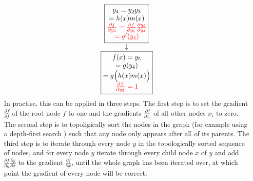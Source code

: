 \begin{equation*}
\begin{matrix}
\begin{matrix}
        \boxed{\begin{matrix}
            y_4 = y_2 y_3 \\
            = h(x) m(x) \\
            \color{red}{\frac{\partial f}{\partial y_4} = \frac{\partial f}{\partial y_5}\frac{\partial y_5}{\partial y_4}} \\
            \color{red}{= g'(y_4)}
        \end{matrix}} \\
        \downarrow \\
        \boxed{\begin{matrix}
            f(x) = y_5 \\
            = g(y_4) \\
            = g\Bigl(h(x) m(x)\Bigr) \\
            \color{red}{\frac{\partial f}{\partial y_5} = 1}
        \end{matrix}}
    \end{matrix}
    \end{matrix}
\end{equation*}
In practise, this can be applied in three steps. The first step is to set the gradient $\frac{\partial f}{\partial f}$ of the root node $f$ to one and the gradients $\frac{\partial f}{\partial x_i}$ of all other nodes $x_i$ to zero. The second step is to topoligically sort the nodes in the graph (for example using a depth-first search \cite{cormen2001section}) such that any node only appears after all of its parents. The third step is to iterate through every node $y$ in the topologically sorted sequence of nodes, and for every node $y$ iterate through every child node $x$ of $y$ and add $\frac{\partial f}{\partial y}\frac{\partial y}{\partial x}$ to the gradient $\frac{\partial f}{\partial x}$, until the whole graph has been iterated over, at which point the gradient of every node will be correct.
